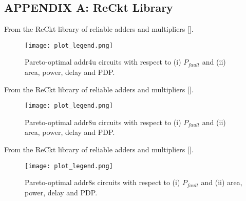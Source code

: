 \begin{center}
\section*{APPENDIX A: ReCkt Library}
\end{center}


From the ReCkt library of reliable adders and multipliers [\cite{reckt_2021_umar}].

\begin{figure*}[htb]
\centering
{}
\hfil
{}
\hfil
\texttt{[image: plot\_legend.png]}
\caption{Pareto-optimal addr4u circuits with respect to (i) $P_{fault}$ and (ii) area, power, delay and PDP.}
\end{figure*}

\pagebreak

From the ReCkt library of reliable adders and multipliers [\cite{reckt_2021_umar}].

\begin{figure*}[htb]
\centering
{}
\hfil
{}
\hfil
\texttt{[image: plot\_legend.png]}
\caption{Pareto-optimal addr8u circuits with respect to (i) $P_{fault}$ and (ii) area, power, delay and PDP.}
\end{figure*}

\pagebreak

From the ReCkt library of reliable adders and multipliers [\cite{reckt_2021_umar}].

\begin{figure*}[htb]
\centering
{}
\hfil
{}
\hfil
\texttt{[image: plot\_legend.png]}
\caption{Pareto-optimal addr8s circuits with respect to (i) $P_{fault}$ and (ii) area, power, delay and PDP.}
\end{figure*}



